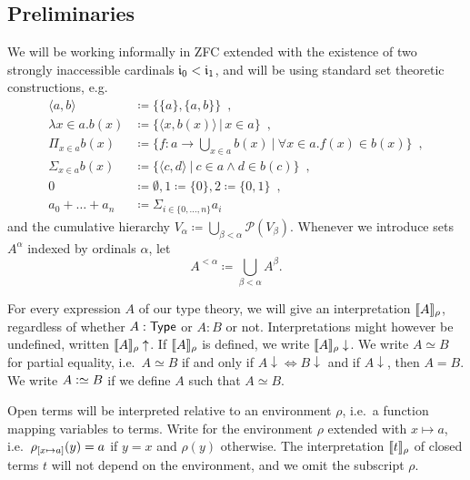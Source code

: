 \documentclass{article}
\begin{document}
\subsection{Preliminaries}

We will be working informally in ZFC extended with the existence of two
strongly inaccessible cardinals $\mathfrak{i}_0 < \mathfrak{i}_1$,
and will be using standard set theoretic constructions, e.g.
\begin{align*}
\langle a, b\rangle &\coloneqq \{ \{ a \}, \{ a, b \}\} \enspace , \\
\lambda x \in a.b(x) &\coloneqq \{\langle x, b(x)\rangle\,|\,x \in a \} \enspace ,\\
\Pi_{x \in a}b(x) &\coloneqq \{ f : a \to \bigcup_{x \in a}b(x)\ |\ \forall x \in a.f(x) \in b(x)\} \enspace , \\
\Sigma_{x \in a}b(x) &\coloneqq \{ \langle c , d\rangle\ |\ c \in a \land d
\in b(c) \} \enspace , \\
0 &\coloneqq \emptyset, 1 \coloneqq \{0\}, 2 \coloneqq \{0, 1\} \enspace , \\
a_0 + \ldots + a_n &\coloneqq \Sigma_{i \in \{0, \ldots, n\}}a_i
\end{align*}
and the cumulative hierarchy $V_{\alpha} \coloneqq
\displaystyle\bigcup_{\beta < \alpha} \mathcal{P}(V_{\beta})$. Whenever we
introduce sets $A^{\alpha}$ indexed by ordinals $\alpha$, let \[A^{< \alpha}
\coloneqq \displaystyle\bigcup_{\beta < \alpha}A^{\beta}.\]

For every expression $A$ of our type theory, we will give an interpretation
$\llbracket A \rrbracket_\rho$, regardless of whether $A : \mathsf{Type}$ or $A : B$ or not. Interpretations
might however be undefined, written $\llbracket A \rrbracket_\rho\uparrow$. If $\llbracket A \rrbracket_\rho$
is defined, we write $\llbracket A \rrbracket_\rho\downarrow$. We write $A \simeq B$ for
partial equality, i.e.\ $A \simeq B$ if and only if $A\downarrow
\Leftrightarrow B\downarrow$ and if $A\downarrow$, then $A = B$. We write $A
\mathrel{\mathop:}\simeq B$ if we define $A$ such that $A \simeq B$.

Open terms will be interpreted relative to an environment $\rho$, i.e.\ a
function mapping variables to terms. Write  for the
environment $\rho$ extended with $x \mapsto a$, i.e.\ $\rho_{[x \mapsto a]}(y) = a$
if $y = x$ and $\rho(y)$ otherwise. The interpretation $\llbracket t \rrbracket_{\rho}$ of closed
terms $t$ will not depend on the environment, and we omit the subscript $\rho$.
\end{document}
